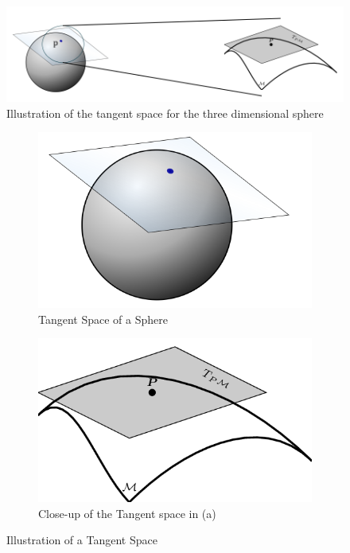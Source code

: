 \documentclass[12pt]{report}
\begin{document}
\begin{figure}[ht]
    \begin{center}
        \includegraphics[scale=0.85]{tan_space_final.PNG}
        \caption{Illustration of the tangent space for the three 
        dimensional sphere}
        \label{fig:Illustration of Tangent Space}
    \end{center}
\end{figure}
\iffalse
\begin{figure}[ht]
\centering
\begin{subfigure}{.5\textwidth}
    \centering
    \includegraphics[scale=0.1]{tangent_space.png}
    \caption{Tangent Space of a Sphere}
    \label{tanspacesphere}
\end{subfigure}%
\begin{subfigure}{.5\textwidth}
    \centering
    \includegraphics[scale=0.35]{tangent_space2.png}
    \caption{Close-up of the Tangent space in (a)}
    \label{tanspacemanifold}
\end{subfigure}
\caption{Illustration of a Tangent Space}
\label{fig:tanspaces}
\end{figure}
\end{document}
